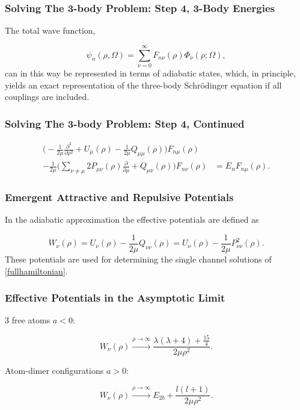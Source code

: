 \documentclass{beamer}
\begin{document}

\begin{frame}
\frametitle{Solving The 3-body Problem: Step 4, 3-Body Energies}
The total wave function, 

\begin{equation}\label{wave}
\psi_{n}(\rho,\Omega) = \sum_{\nu=0}^{\infty} F_{n\nu}(\rho)\Phi_{\nu}(\rho;\Omega),
\end{equation}
can in this way be represented in terms of adiabatic states, which, in principle, yields an exact representation of the three-body Schr{\"o}dinger equation if all couplings are included.
\end{frame}

\begin{frame}
\frametitle{Solving The 3-body Problem: Step 4, Continued}
\begin{align}\label{fullhamiltonian}
\bigg(-\frac{1}{2 \mu}\frac{\partial^2}{ \partial \rho^2} + U_{\mu}(\rho) - \frac{1}{2\mu}Q_{\mu\mu}(\rho) \bigg)F_{n\mu}(\rho)&\nonumber\\ -\frac{1}{2\mu}\bigg(\sum_{\nu\neq\mu}2P_{\mu\nu}(\rho)\frac{\partial}{\partial\rho} + Q_{\mu\nu}(\rho) \bigg)F_{n\nu}(\rho)& = E_nF_{n\mu}(\rho).
\end{align}
\end{frame}

\begin{frame}
\frametitle{Emergent Attractive and Repulsive Potentials}
In the adiabatic approximation the effective potentials are defined as 

\begin{equation}
W_{\nu}(\rho) = U_{\nu}(\rho)-\frac{1}{2\mu}Q_{\nu \nu}(\rho) = U_{\nu}(\rho)-\frac{1}{2\mu}P_{\nu \nu}^2(\rho).
\end{equation} 
These potentials are used for determining the single channel solutions of \eqref{fullhamiltonian}. 
\end{frame}

\begin{frame}
\frametitle{Effective Potentials in the Asymptotic Limit}
3 free atoms $a<0$:

\begin{equation}
W_{\nu}(\rho)  \xrightarrow{ \rho \to \infty} \frac{\lambda(\lambda+4)+\frac{15}{4}}{2\mu \rho^2}.
\end{equation}

Atom-dimer configurations $a>0$:

\begin{equation}
W_{\nu}(\rho)  \xrightarrow{ \rho \to \infty} E_{2b} +\frac{l(l+1)}{2\mu \rho^2}.
\end{equation} 
\end{frame}
\end{document}
